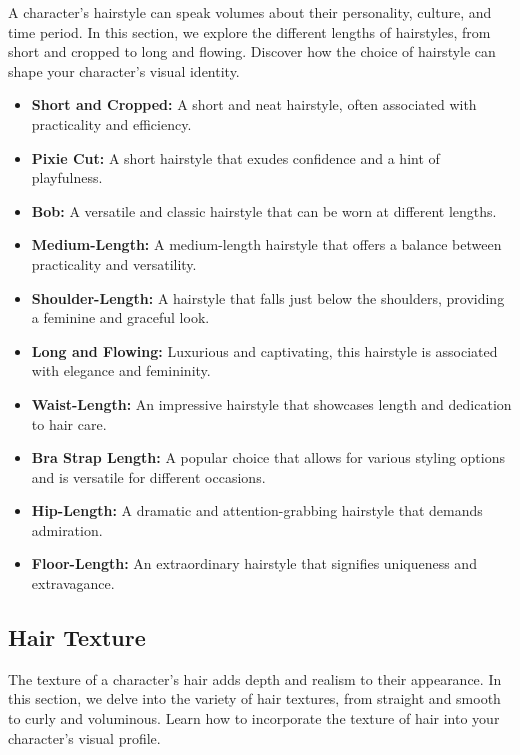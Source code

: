 \documentclass[12pt]{book}  %
\begin{document}
A character's hairstyle can speak volumes about their personality, culture, and time period. In this section, we explore the different lengths of hairstyles, from short and cropped to long and flowing. Discover how the choice of hairstyle can shape your character's visual identity.

\begin{itemize}
    \item \textbf{Short and Cropped:} A short and neat hairstyle, often associated with practicality and efficiency.
    \item \textbf{Pixie Cut:} A short hairstyle that exudes confidence and a hint of playfulness.
    \item \textbf{Bob:} A versatile and classic hairstyle that can be worn at different lengths.
    \item \textbf{Medium-Length:} A medium-length hairstyle that offers a balance between practicality and versatility.
    \item \textbf{Shoulder-Length:} A hairstyle that falls just below the shoulders, providing a feminine and graceful look.
    \item \textbf{Long and Flowing:} Luxurious and captivating, this hairstyle is associated with elegance and femininity.
    \item \textbf{Waist-Length:} An impressive hairstyle that showcases length and dedication to hair care.
    \item \textbf{Bra Strap Length:} A popular choice that allows for various styling options and is versatile for different occasions.
    \item \textbf{Hip-Length:} A dramatic and attention-grabbing hairstyle that demands admiration.
    \item \textbf{Floor-Length:} An extraordinary hairstyle that signifies uniqueness and extravagance.
\end{itemize}

\subsection{\textbf{Hair Texture}}

The texture of a character's hair adds depth and realism to their appearance. In this section, we delve into the variety of hair textures, from straight and smooth to curly and voluminous. Learn how to incorporate the texture of hair into your character's visual profile.
\end{document}
